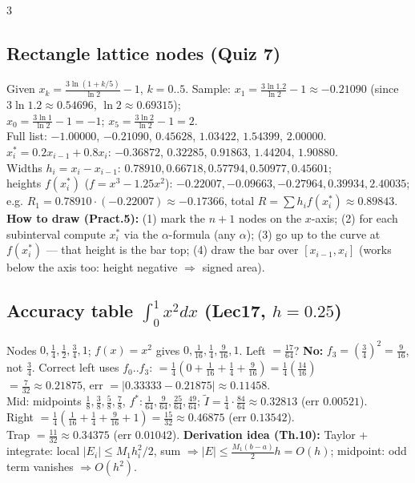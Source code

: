 \documentclass[9pt]{extarticle}
\newcommand{\hl}[1]{\textbf{\textcolor{BrickRed}{#1}}}
\newcommand{\wk}[1]{\textbf{\textcolor{OliveGreen}{#1}}}
\begin{document}
\begin{multicols}{3}
\begin{sloppypar}
\subsection{Rectangle lattice nodes (Quiz 7)}
Given $x_k=\tfrac{3\ln(1+k/5)}{\ln2}-1$, $k=0..5$. Sample: $x_1=\tfrac{3\ln1.2}{\ln2}-1\approx-0.21090$ (since $3\ln1.2\approx0.54696$, $\ln2\approx0.69315$);\\
$x_0=\tfrac{3\ln1}{\ln2}-1=-1$; $x_5=\tfrac{3\ln2}{\ln2}-1=2$.\\
Full list: $-1.00000$, $-0.21090$, $0.45628$, $1.03422$, $1.54399$, $2.00000$.
$x_i^*=0.2x_{i-1}+0.8x_i$: $-0.36872$, $0.32285$, $0.91863$, $1.44204$, $1.90880$.\\
Widths $h_i=x_i-x_{i-1}$: $0.78910,0.66718,0.57794,0.50977,0.45601$;\\
heights $f(x_i^*)$ ($f=x^3-1.25x^2$): $-0.22007,-0.09663,-0.27964,0.39934,2.40035$;\\
e.g. $R_1=0.78910\cdot(-0.22007)\approx-0.17366$, total $R=\sum h_if(x_i^*)\approx0.89843$.\\
\wk{How to draw (Pract.5):} (1) mark the $n{+}1$ nodes on the $x$-axis; (2) for each subinterval compute $x_i^*$ via the $\alpha$-formula (any $\alpha$); (3) go up to the curve at $f(x_i^*)$ — that height is the bar top; (4) draw the bar over $[x_{i-1},x_i]$ (works below the axis too: height negative $\Rightarrow$ signed area).

\subsection{Accuracy table $\int_0^1x^2dx$ (Lec17, $h=0.25$)}
Nodes $0,\tfrac14,\tfrac12,\tfrac34,1$; $f(x)=x^2$ gives $0,\tfrac1{16},\tfrac14,\tfrac9{16},1$.
Left $=\tfrac{17}{64}$? \hl{No:} $f_3=(\tfrac34)^2=\tfrac9{16}$, not $\tfrac34$. Correct left uses $f_0..f_3$: $=\tfrac14(0+\tfrac1{16}+\tfrac14+\tfrac9{16})=\tfrac14(\tfrac{14}{16})$\\
$=\tfrac7{32}\approx0.21875$, err $=|0.33333-0.21875|\approx0.11458$.\\
Mid: midpoints $\tfrac18,\tfrac38,\tfrac58,\tfrac78$, $f^*: \tfrac1{64},\tfrac9{64},\tfrac{25}{64},\tfrac{49}{64}$; $\tilde I=\tfrac14\cdot\tfrac{84}{64}\approx0.32813$ (err $0.00521$).\\
Right $=\tfrac14(\tfrac1{16}+\tfrac14+\tfrac9{16}+1)=\tfrac{15}{32}\approx0.46875$ (err $0.13542$).\\
Trap $=\tfrac{11}{32}\approx0.34375$ (err $0.01042$).
\wk{Derivation idea (Th.10):} Taylor + integrate: local $|E_i|\le M_1h_i^2/2$, sum $\Rightarrow|E|\le\tfrac{M_1(b-a)}2h=O(h)$; midpoint: odd term vanishes $\Rightarrow O(h^2)$.


\end{sloppypar}
\end{multicols}
\end{document}
